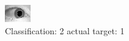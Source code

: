 \begin{figure}[h!]
\begin{center}
\includegraphics[width=0.60\columnwidth]{figures/ID1422_class_2_target_1.png}
\end{center}
\caption{ Classification: 2 actual target: 1}
\label{fig:ID1422_class_2_target_1}
\end{figure}
